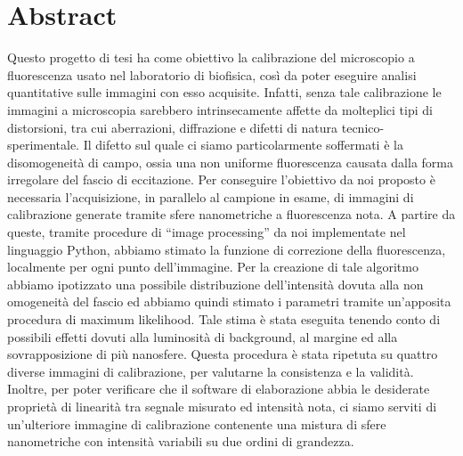 \clearpage{\pagestyle{empty}\cleardoublepage}

\chapter*{Abstract}

Questo progetto di tesi ha come obiettivo la calibrazione del microscopio a fluorescenza usato nel laboratorio di biofisica, così da poter eseguire analisi quantitative sulle immagini con esso acquisite. 
Infatti, senza tale calibrazione le immagini a microscopia sarebbero intrinsecamente affette da molteplici tipi di distorsioni, tra cui aberrazioni, diffrazione e difetti di natura tecnico-sperimentale. 
Il difetto sul quale ci siamo particolarmente soffermati è la disomogeneità di campo, ossia una non uniforme fluorescenza causata dalla forma irregolare del fascio di eccitazione.
Per conseguire l'obiettivo da noi proposto è necessaria l'acquisizione, in parallelo al campione in esame, di immagini di calibrazione generate tramite sfere nanometriche a fluorescenza nota.
A partire da queste, tramite procedure di ``image processing'' da noi implementate nel linguaggio Python, abbiamo stimato la funzione di correzione della fluorescenza, localmente per ogni punto dell'immagine.
Per la creazione di tale algoritmo abbiamo ipotizzato una possibile distribuzione dell'intensità dovuta alla non omogeneità del fascio ed abbiamo quindi stimato i parametri tramite un'apposita procedura di maximum likelihood.
Tale stima è stata eseguita tenendo conto di possibili effetti dovuti alla luminosità di background, al margine ed alla sovrapposizione di più nanosfere.
Questa procedura è stata ripetuta su quattro diverse immagini di calibrazione, per valutarne la consistenza e la validità.
Inoltre, per poter verificare che il software di elaborazione abbia le desiderate proprietà di linearità tra segnale misurato ed intensità nota, ci siamo serviti di un'ulteriore immagine di calibrazione contenente una mistura di sfere nanometriche con intensità variabili su due ordini di grandezza.
